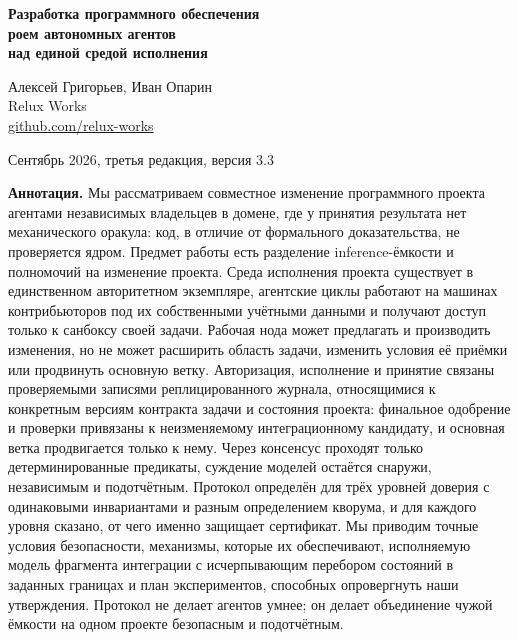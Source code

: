 \documentclass[11pt,a4paper]{article}
\begin{document}
\begin{center}
{\fontsize{17}{21}\selectfont\bfseries Разработка программного обеспечения\\[2pt] роем автономных агентов\\[2pt] над единой средой исполнения\par}
\vspace{14pt}
{\normalsize Алексей Григорьев, Иван Опарин\\
Relux Works\\
\href{https://github.com/relux-works}{github.com/relux-works}\par}
\vspace{4pt}
{\normalsize Сентябрь 2026, третья редакция, версия 3.3\par}
\end{center}

\vspace{10pt}

\begin{list}{}{\leftmargin=1.2cm\rightmargin=1.2cm}
\item
\textbf{Аннотация.} Мы рассматриваем совместное изменение программного проекта агентами независимых владельцев в домене, где у принятия результата нет механического оракула: код, в отличие от формального доказательства, не проверяется ядром. Предмет работы есть разделение inference-ёмкости и полномочий на изменение проекта. Среда исполнения проекта существует в единственном авторитетном экземпляре, агентские циклы работают на машинах контрибьюторов под их собственными учётными данными и получают доступ только к санбоксу своей задачи. Рабочая нода может предлагать и производить изменения, но не может расширить область задачи, изменить условия её приёмки или продвинуть основную ветку. Авторизация, исполнение и принятие связаны проверяемыми записями реплицированного журнала, относящимися к конкретным версиям контракта задачи и состояния проекта: финальное одобрение и проверки привязаны к неизменяемому интеграционному кандидату, и основная ветка продвигается только к нему. Через консенсус проходят только детерминированные предикаты, суждение моделей остаётся снаружи, независимым и подотчётным. Протокол определён для трёх уровней доверия с одинаковыми инвариантами и разным определением кворума, и для каждого уровня сказано, от чего именно защищает сертификат. Мы приводим точные условия безопасности, механизмы, которые их обеспечивают, исполняемую модель фрагмента интеграции с исчерпывающим перебором состояний в заданных границах и план экспериментов, способных опровергнуть наши утверждения. Протокол не делает агентов умнее; он делает объединение чужой ёмкости на одном проекте безопасным и подотчётным.
\end{list}
\end{document}
